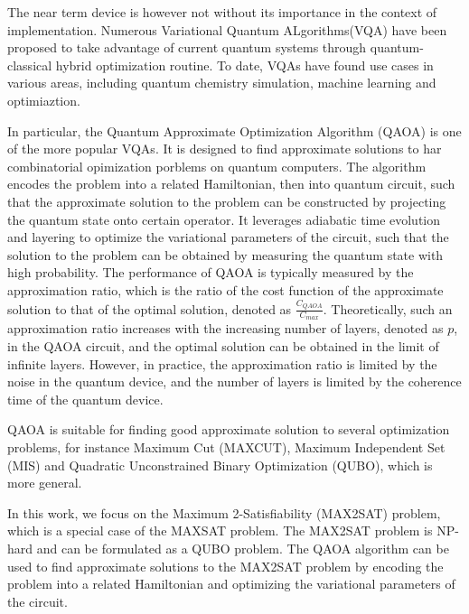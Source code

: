 \documentclass[%
 reprint,
 amsmath,amssymb,
 aps,
]{revtex4-2}
\begin{document}
The near term device is however not without its importance in the context of implementation. Numerous Variational Quantum ALgorithms(VQA) have been proposed to take advantage of current quantum systems through quantum-classical hybrid optimization routine. \cite{McClean_2016, Bharti_2022, Cerezo_2021, Bravo_Prieto_2023, PhysRevA.95.062317} To date, VQAs have found use cases in various areas, including quantum chemistry simulation, machine learning and optimiaztion. \cite{Kokail_2019, Bauer_2020, lloyd2020quantum, PhysRevA.104.052402, Amaro_2022} 

In particular, the Quantum Approximate Optimization Algorithm (QAOA) is one of the more popular VQAs. It is designed to find approximate solutions to har combinatorial opimization porblems on quantum computers. The algorithm encodes the problem into a related Hamiltonian, then into quantum circuit, such that the approximate solution to the problem can be constructed by projecting the quantum state onto certain operator. It leverages adiabatic time evolution and layering to optimize the variational parameters of the circuit, such that the solution to the problem can be obtained by measuring the quantum state with high probability. The performance of QAOA is typically measured by the approximation ratio, which is the ratio of the cost function of the approximate solution to that of the optimal solution, denoted as $\frac{C_{QAOA}}{C_{max}}$. Theoretically, such an approximation ratio increases with the increasing number of layers, denoted as $p$, in the QAOA circuit, and the optimal solution can be obtained in the limit of infinite layers. However, in practice, the approximation ratio is limited by the noise in the quantum device, and the number of layers is limited by the coherence time of the quantum device.

QAOA is suitable for finding good approximate solution to several optimization problems, for instance Maximum Cut (MAXCUT)\cite{farhi2014quantum}, Maximum Independent Set (MIS)\cite{Zhou_2020} and Quadratic Unconstrained Binary Optimization (QUBO)\cite{farhi2014quantum}, which is more general.

In this work, we focus on the Maximum 2-Satisfiability (MAX2SAT) problem, which is a special case of the MAXSAT problem. The MAX2SAT problem is NP-hard and can be formulated as a QUBO problem. The QAOA algorithm can be used to find approximate solutions to the MAX2SAT problem by encoding the problem into a related Hamiltonian and optimizing the variational parameters of the circuit.
\end{document}
